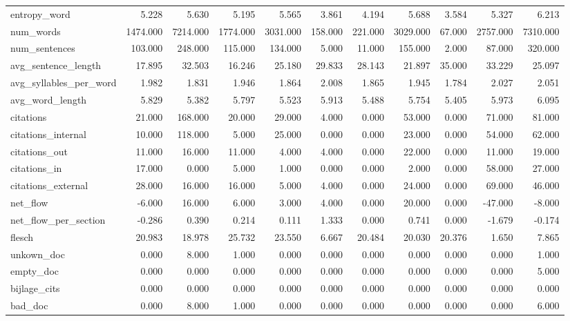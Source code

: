 \begin{tabular}{lrrrrrrrrrr}
\cline{1-11}
entropy\_word & 5.228 & 5.630 & 5.195 & 5.565 & 3.861 & 4.194 & 5.688 & 3.584 & 5.327 & 6.213 \\
\cline{1-11}
num\_words & 1474.000 & 7214.000 & 1774.000 & 3031.000 & 158.000 & 221.000 & 3029.000 & 67.000 & 2757.000 & 7310.000 \\
\cline{1-11}
num\_sentences & 103.000 & 248.000 & 115.000 & 134.000 & 5.000 & 11.000 & 155.000 & 2.000 & 87.000 & 320.000 \\
\cline{1-11}
avg\_sentence\_length & 17.895 & 32.503 & 16.246 & 25.180 & 29.833 & 28.143 & 21.897 & 35.000 & 33.229 & 25.097 \\
\cline{1-11}
avg\_syllables\_per\_word & 1.982 & 1.831 & 1.946 & 1.864 & 2.008 & 1.865 & 1.945 & 1.784 & 2.027 & 2.051 \\
\cline{1-11}
avg\_word\_length & 5.829 & 5.382 & 5.797 & 5.523 & 5.913 & 5.488 & 5.754 & 5.405 & 5.973 & 6.095 \\
\cline{1-11}
citations & 21.000 & 168.000 & 20.000 & 29.000 & 4.000 & 0.000 & 53.000 & 0.000 & 71.000 & 81.000 \\
\cline{1-11}
citations\_internal & 10.000 & 118.000 & 5.000 & 25.000 & 0.000 & 0.000 & 23.000 & 0.000 & 54.000 & 62.000 \\
\cline{1-11}
citations\_out & 11.000 & 16.000 & 11.000 & 4.000 & 4.000 & 0.000 & 22.000 & 0.000 & 11.000 & 19.000 \\
\cline{1-11}
citations\_in & 17.000 & 0.000 & 5.000 & 1.000 & 0.000 & 0.000 & 2.000 & 0.000 & 58.000 & 27.000 \\
\cline{1-11}
citations\_external & 28.000 & 16.000 & 16.000 & 5.000 & 4.000 & 0.000 & 24.000 & 0.000 & 69.000 & 46.000 \\
\cline{1-11}
net\_flow & -6.000 & 16.000 & 6.000 & 3.000 & 4.000 & 0.000 & 20.000 & 0.000 & -47.000 & -8.000 \\
\cline{1-11}
net\_flow\_per\_section & -0.286 & 0.390 & 0.214 & 0.111 & 1.333 & 0.000 & 0.741 & 0.000 & -1.679 & -0.174 \\
\cline{1-11}
flesch & 20.983 & 18.978 & 25.732 & 23.550 & 6.667 & 20.484 & 20.030 & 20.376 & 1.650 & 7.865 \\
\cline{1-11}
unkown\_doc & 0.000 & 8.000 & 1.000 & 0.000 & 0.000 & 0.000 & 0.000 & 0.000 & 0.000 & 1.000 \\
\cline{1-11}
empty\_doc & 0.000 & 0.000 & 0.000 & 0.000 & 0.000 & 0.000 & 0.000 & 0.000 & 0.000 & 5.000 \\
\cline{1-11}
bijlage\_cits & 0.000 & 0.000 & 0.000 & 0.000 & 0.000 & 0.000 & 0.000 & 0.000 & 0.000 & 0.000 \\
\cline{1-11}
bad\_doc & 0.000 & 8.000 & 1.000 & 0.000 & 0.000 & 0.000 & 0.000 & 0.000 & 0.000 & 6.000 \\
\cline{1-11}
\bottomrule
\end{tabular}
